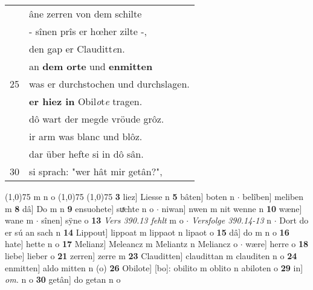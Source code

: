 \documentclass[8pt,a4paper,notitlepage]{article}
\begin{document}
\begin{table}[ht]
\begin{minipage}[t]{0.5\linewidth}
\begin{tabular}{rl}
 & âne zerren von dem schilte\\ 
 & - sînen prîs er hœher zilte -,\\ 
 & den gap er Clauditt\textit{e}n.\\ 
 & an \textbf{dem orte} und \textbf{enmitten}\\ 
25 & was er durchstochen und durchslagen.\\ 
 & \textbf{er hiez in} Obil\textit{o}t\textit{e} tragen.\\ 
 & dô wart der megde vröude grôz.\\ 
 & ir arm was blanc und blôz.\\ 
 & dar über hefte si in dô sân.\\ 
30 & si sprach: "wer hât mir getân?",\\ 
\end{tabular}
\scriptsize
\line(1,0){75} \newline
m n o \newline
\line(1,0){75} \newline
\newline
\line(1,0){75} \newline
\textbf{3} liez] Liesse n \textbf{5} bâten] boten n  $\cdot$ belîben] meliben m \textbf{8} dâ] Do m n \textbf{9} ensuohete] suͯchte n o  $\cdot$ niwan] nwen m nit wenne n \textbf{10} wæne] wane m  $\cdot$ sînen] sÿne o \textbf{13} \textit{Vers 390.13 fehlt} m o   $\cdot$ \textit{Versfolge 390.14-13} n   $\cdot$ Dort do er sú an sach n \textbf{14} Lippout] lippoat m lippaot n lipaot o \textbf{15} dâ] do m n o \textbf{16} hate] hette n o \textbf{17} Melianz] Meleancz m Meliantz n Meliancz o  $\cdot$ wære] herre o \textbf{18} liebe] lieber o \textbf{21} zerren] zerre m \textbf{23} Clauditten] claudittan m clauditen n o \textbf{24} enmitten] aldo mitten n (o) \textbf{26} Obilote] [bo]: obilito m oblito n abiloten o \textbf{29} in] \textit{om.} n o \textbf{30} getân] do getan n o \newline
\end{minipage}
\end{table}
\newpage
\end{document}
